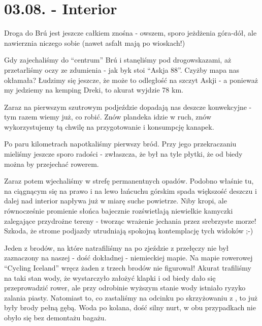 \chapter{03.08. - Interior}

Droga do Brú jest jeszcze całkiem znośna - owszem, sporo jeżdżenia góra-dół, ale nawierznia niczego sobie (nawet asfalt mają po wioskach!)

Gdy zajechaliśmy do “centrum” Brú i stanęliśmy pod drogowskazami, aż przetarliśmy oczy ze zdumienia - jak byk stoi “Askja 88”. Czyżby mapa nas okłamała? Łudzimy się jeszcze, że może to odległość na szczyt Askji - a ponieważ my jedziemy na kemping Dreki, to akurat wyjdzie 78 km.

Zaraz na pierwszym szutrowym podjeździe dopadają nas deszcze konwekcyjne - tym razem wiemy już, co robić. Znów plandeka idzie w ruch, znów wykorzystujemy tą chwilę na przygotowanie i konsumpcję kanapek.

Po paru kilometrach napotkaliśmy pierwszy bród. Przy jego przekraczaniu mieliśmy jeszcze sporo radości - zwłaszcza, że był na tyle płytki, że od biedy można by przejechać rowerem.

Zaraz potem wjechaliśmy w strefę permanentnych opadów. Podobno właśnie tu, na ciągnącym się na prawo i na lewo łańcuchu górskim spada większość deszczu i dalej nad interior napływa już w miarę suche powietrze. Niby kropi, ale równocześnie promienie słońca bajecznie rozświetlają niewielkie kamyczki zalegające przydrożne tereny - tworząc wrażenie jechania przez srebrzyste morze! Szkoda, że strome podjazdy utrudniają spokojną kontemplację tych widoków ;-)


Jeden z brodów, na które natrafiliśmy na  po zjeździe z przełęczy nie był zaznaczony na naszej - dość dokładnej - niemieckiej mapie. Na mapie rowerowej “Cycling Iceland” wręcz żaden z trzech brodów nie figurował! Akurat trafiliśmy na taki stan wody, że wystarczyło założyć klapki i od biedy dało się przeprowadzić rower, ale przy odrobinie wyższym stanie wody istniało ryzyko zalania piasty. Natomiast to, co zastaliśmy na odcinku po skrzyżowaniu z , to już były brody pełną gębą. Woda po kolana, dość silny nurt, w obu przypadkach nie obyło się bez demontażu bagażu.



